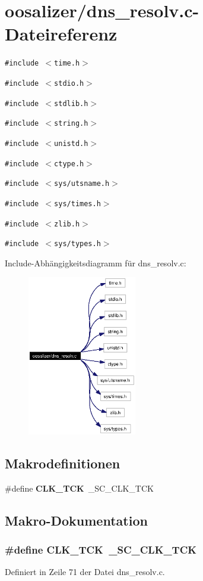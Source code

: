\section{oosalizer/dns\_\-resolv.c-Dateireferenz}
\label{dns__resolv_8c}
{\tt \#include $<$time.h$>$}\par
{\tt \#include $<$stdio.h$>$}\par
{\tt \#include $<$stdlib.h$>$}\par
{\tt \#include $<$string.h$>$}\par
{\tt \#include $<$unistd.h$>$}\par
{\tt \#include $<$ctype.h$>$}\par
{\tt \#include $<$sys/utsname.h$>$}\par
{\tt \#include $<$sys/times.h$>$}\par
{\tt \#include $<$zlib.h$>$}\par
{\tt \#include $<$sys/types.h$>$}\par


Include-Abh\"{a}ngigkeitsdiagramm f\"{u}r dns\_\-resolv.c:\begin{figure}[H]
\begin{center}
\leavevmode
\includegraphics[width=135pt]{dns__resolv_8c__incl}
\end{center}
\end{figure}
\subsection*{Makrodefinitionen}
\begin{CompactItemize}
\item 
\#define {\bf CLK\_\-TCK}~\_\-SC\_\-CLK\_\-TCK
\end{CompactItemize}


\subsection{Makro-Dokumentation}
\subsubsection{\setlength{\rightskip}{0pt plus 5cm}\#define CLK\_\-TCK~\_\-SC\_\-CLK\_\-TCK}\label{dns__resolv_8c_03df76d1f70664d745ca8de2864e39b3}




Definiert in Zeile 71 der Datei dns\_\-resolv.c.